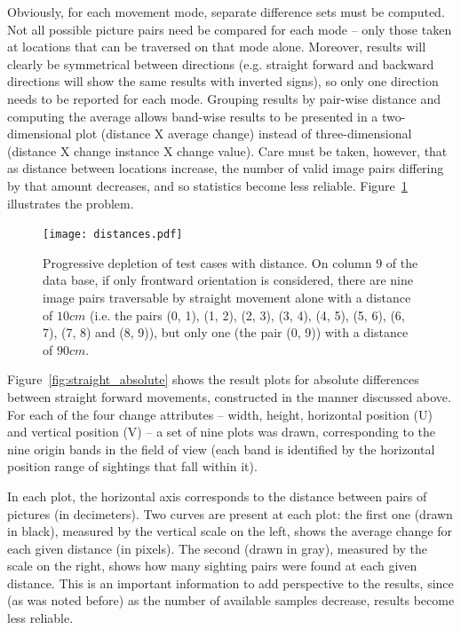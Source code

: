 \documentclass[twocolumn, 9pt]{jsproceedings}
\begin{document}
Obviously, for each movement mode, separate difference sets must be computed. Not all possible picture pairs need be compared for each mode -- only those taken at locations that can be traversed on that mode alone. Moreover, results will clearly be symmetrical between directions (e.g. straight forward and backward directions will show the same results with inverted signs), so only one direction needs to be reported for each mode. Grouping results by pair-wise distance and computing the average allows band-wise results to be presented in a two-dimensional plot (distance X average change) instead of three-dimensional (distance X change instance X change value). Care must be taken, however, that as distance between locations increase, the number of valid image pairs differing by that amount decreases, and so statistics become less reliable. Figure~\ref{fig:distances} illustrates the problem.

\begin{figure}[h!]
\texttt{[image: distances.pdf]}
\caption{Progressive depletion of test cases with distance. On column \(9\) of the data base, if only frontward orientation is considered, there are nine image pairs traversable by straight movement alone with a distance of \(10cm\) (i.e. the pairs (0, 1), (1, 2), (2, 3), (3, 4), (4, 5), (5, 6), (6, 7), (7, 8) and (8, 9)), but only one (the pair (0, 9)) with a distance of \(90cm\).}
\label{fig:distances}
\end{figure}

Figure~\ref{fig:straight_absolute} shows the result plots for absolute differences between straight forward movements, constructed in the manner discussed above. For each of the four change attributes -- width, height, horizontal position (U) and vertical position (V) -- a set of nine plots was drawn, corresponding to the nine origin bands in the field of view (each band is identified by the horizontal position range of sightings that fall within it).

In each plot, the horizontal axis corresponds to the distance between pairs of pictures (in decimeters). Two curves are present at each plot: the first one (drawn in black), measured by the vertical scale on the left, shows the average change for each given distance (in pixels). The second (drawn in gray), measured by the scale on the right, shows how many sighting pairs were found at each given distance. This is an important information to add perspective to the results, since (as was noted before) as the number of available samples decrease, results become less reliable.
\end{document}

